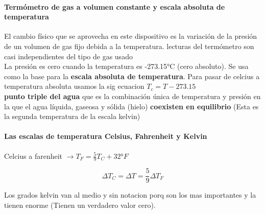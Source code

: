 \documentclass[10pt]{article}
\begin{document}
\paragraph{Termómetro de gas a volumen constante y escala absoluta de temperatura}

El cambio físico que se aprovecha en este dispositivo es la variación de la presión de un volumen de gas fijo debida a la temperatura.  lecturas del termómetro son casi independientes del tipo de gas usado\\
La presión es cero cuando la temperatura es -273.15°C (cero absoluto).  Se usa como la base para la \textbf{escala absoluta de temperatura}. Para pasar de celcius a temperatura absoluta usamos la sig ecuacion $T_c = T - 273.15$\\
\linebreak
\textbf{punto triple del agua} que es la combinación única de temperatura y presión en la que el
agua líquida, gaseosa y sólida (hielo) \textbf{coexisten en equilibrio} (Esta es la segunda temperatura de la escala kelvin)

\paragraph{Las escalas de temperatura Celsius, Fahrenheit y Kelvin}

Celcius a farenheit $\rightarrow T_F = \frac{5}{9} T_C + 32°F$

\begin{equation*}
	\Delta T_C = \Delta T = \frac{5}{9} \Delta T_F
\end{equation*}

Los grados kelvin van al medio y sin notacion porq son los mas importantes y la tienen enorme (Tienen un verdadero valor cero).
\end{document}
